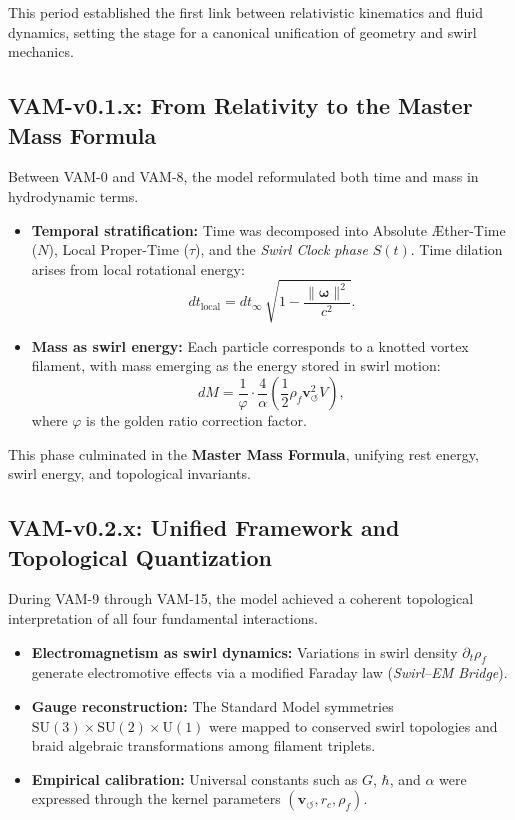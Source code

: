 \documentclass[10pt,reprint,aps,onecolumn,nofootinbib]{revtex4-2}
\newcommand{\vswirl}{\mathbf{v}_{\!\boldsymbol{\circlearrowleft}}}
\newcommand{\rhof}{\rho_{\!f}}                           %
\newcommand{\rc}{r_c}                                    %
\providecommand{\rc}{r_c}
\begin{document}
        This period established the first link between relativistic kinematics and fluid dynamics, setting the stage for a canonical unification of geometry and swirl mechanics.

    \subsection{VAM-v0.1.x: From Relativity to the Master Mass Formula}

        Between VAM-0 and VAM-8, the model reformulated both time and mass in hydrodynamic terms.

        \begin{itemize}
            \item \textbf{Temporal stratification:} Time was decomposed into Absolute Æther-Time ($N$), Local Proper-Time ($\tau$), and the \emph{Swirl Clock phase} $S(t)$.
            Time dilation arises from local rotational energy:
            \[
                dt_{\text{local}} = dt_{\infty}\,\sqrt{1-\frac{\|\boldsymbol{\omega}\|^2}{c^2}}.
            \]
            \item \textbf{Mass as swirl energy:} Each particle corresponds to a knotted vortex filament, with mass emerging as the energy stored in swirl motion:
            \[d
            M = \frac{1}{\varphi}\cdot \frac{4}{\alpha}\left(\frac{1}{2}\rhof \vswirl^2 V\right),
            \]
            where $\varphi$ is the golden ratio correction factor.
        \end{itemize}

        This phase culminated in the \textbf{Master Mass Formula}, unifying rest energy, swirl energy, and topological invariants.

    \subsection{VAM-v0.2.x: Unified Framework and Topological Quantization}

        During VAM-9 through VAM-15, the model achieved a coherent topological interpretation of all four fundamental interactions.

        \begin{itemize}
            \item \textbf{Electromagnetism as swirl dynamics:} Variations in swirl density $\partial_t\rho_{\!f}$ generate electromotive effects via a modified Faraday law (\emph{Swirl--EM Bridge}).
            \item \textbf{Gauge reconstruction:} The Standard Model symmetries $\mathrm{SU}(3)\times\mathrm{SU}(2)\times\mathrm{U}(1)$ were mapped to conserved swirl topologies and braid algebraic transformations among filament triplets.
            \item \textbf{Empirical calibration:} Universal constants such as $G$, $\hbar$, and $\alpha$ were expressed through the kernel parameters $(\vswirl,\rc,\rhof)$.
        \end{itemize}
\end{document}

